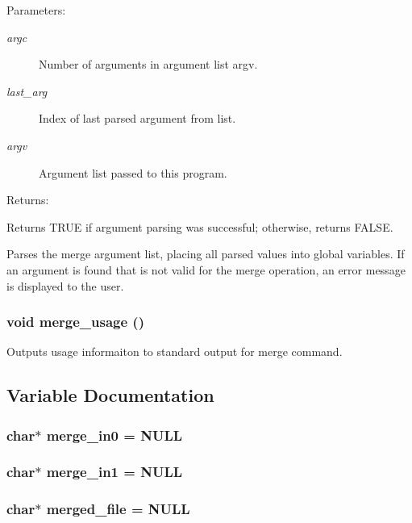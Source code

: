 \begin{Desc}
\item[Parameters: ]\par
\begin{description}
\item[{\em 
argc}]Number of arguments in argument list argv. \item[{\em 
last\_\-arg}]Index of last parsed argument from list. \item[{\em 
argv}]Argument list passed to this program.\end{description}
\end{Desc}
\begin{Desc}
\item[Returns: ]\par
Returns TRUE if argument parsing was successful; otherwise, returns FALSE.\end{Desc}
Parses the merge argument list, placing all parsed values into global variables. If an argument is found that is not valid for the merge operation, an error message is displayed to the user. 
\subsubsection{\setlength{\rightskip}{0pt plus 5cm}void merge\_\-usage ()}\label{merge_8c_a3}


Outputs usage informaiton to standard output for merge command. 

\subsection{Variable Documentation}
\subsubsection{\setlength{\rightskip}{0pt plus 5cm}char$\ast$ merge\_\-in0 = NULL}\label{merge_8c_a1}


\subsubsection{\setlength{\rightskip}{0pt plus 5cm}char$\ast$ merge\_\-in1 = NULL}\label{merge_8c_a2}


\subsubsection{\setlength{\rightskip}{0pt plus 5cm}char$\ast$ merged\_\-file = NULL}\label{merge_8c_a0}


